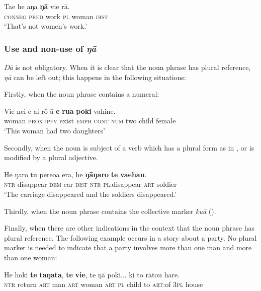 \ea\label{ex:5.76}
\gll Ta{\ꞌ}e he aŋa \textbf{ŋā} vi{\ꞌ}e rā. \\
\textsc{conneg} \textsc{pred} work \textsc{pl} woman \textsc{dist} \\

\glt 
‘That’s not women’s work.’ \textstyleExampleref{[R347.103]} 
\z

\subsubsection[Use and non{}-use of ŋā ]{Use and non-use of \textit{ŋā}} \label{sec:5.5.1.2}

\textit{Ŋā} is not obligatory. When it is clear that the noun phrase has plural reference, \textit{ŋā} can be left out; this happens in the following situations:

Firstly, when the noun phrase contains a numeral:

\ea\label{ex:5.77}
\gll Vi{\ꞌ}e nei e ai rō {\ꞌ}ā \textbf{e} \textbf{rua} \textbf{poki} vahine. \\
woman \textsc{prox} \textsc{ipfv} exist \textsc{emph} \textsc{cont} \textsc{num} two child female \\

\glt 
‘This woman had two daughters’ \textstyleExampleref{[R491.008]} 
\z

Secondly, when the noun is subject of a verb which has a plural form as in , or is modified by a plural adjective.

\ea\label{ex:5.78}
\gll He ŋaro tū pere{\ꞌ}oa era, he \textbf{ŋāŋaro} \textbf{te} \textbf{va{\ꞌ}ehau}. \\
\textsc{ntr} disappear \textsc{dem} car \textsc{dist} \textsc{ntr} \textsc{pl}:disappear \textsc{art} soldier \\

\glt 
‘The carriage disappeared and the soldiers disappeared.’ \textstyleExampleref{[R491.039]} 
\z

Thirdly, when the noun phrase contains the collective marker \textit{kuā} ().

Finally, when there are other indications in the context that the noun phrase has plural reference. The following example occurs in a story about a party. No plural marker is needed to indicate that a party involves more than one man and more than one woman:

\ea\label{ex:5.79}
\gll He hoki \textbf{te} \textbf{taŋata}, \textbf{te} \textbf{vi{\ꞌ}e}, te ŋā poki... ki to rātou hare. \\
\textsc{ntr} return \textsc{art} man \textsc{art} woman \textsc{art} \textsc{pl} child to \textsc{art}:of \textsc{3pl} house \\

